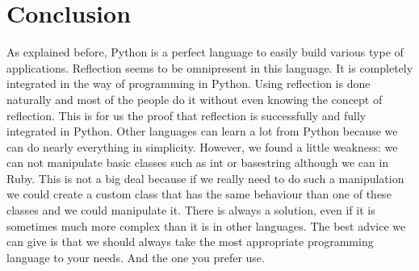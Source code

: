 \section{Conclusion}

As explained before, Python is a perfect language to easily build various type of applications. 
Reflection seems to be omnipresent in this language. 
It is completely integrated in the way of programming in Python.
Using reflection is done naturally and most of the people do it without even knowing the concept of reflection. 
This is for us the proof that reflection is successfully and fully integrated in Python.
Other languages can learn a lot from Python because we can do nearly everything in simplicity.
However, we found a little weakness: we can not manipulate basic classes such as int or basestring although we can in Ruby.
This is not a big deal because if we really need to do such a manipulation we could create a custom class that has the same behaviour than one of these classes and we could manipulate it.
There is always a solution, even if it is sometimes much more complex than it is in other languages.
The best advice we can give is that we should always take the most appropriate programming language to your needs.
And the one you prefer use.
